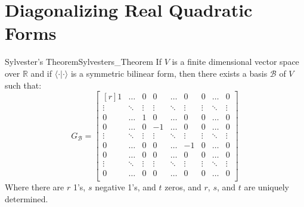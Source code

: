 \documentclass[crop=false,class=article]{standalone}                           %
\begin{document}
    \section{Diagonalizing Real Quadratic Forms}
        \begin{ltheorem}{Sylvester's Theorem}{Sylvesters_Theorem}
            If $V$ is a finite dimensional vector space over $\mathbb{R}$ and if
            $\langle\cdot|\cdot\rangle$ is a symmetric bilinear form, then there
            exists a basis $\mathscr{B}$ of $V$ such that:
            \begin{equation}
                G_{\mathscr{B}}=
                \begin{bmatrix*}[r]
                    1&\dots&0&0&\dots&0&0&\dots&0\\
                    \vdots&\ddots&\vdots&\vdots&\ddots
                        &\vdots&\vdots&\ddots&\vdots\\
                    0&\dots&1&0&\dots&0&0&\dots&0\\
                    0&\dots&0&\minus{1}&\dots&0&0&\dots&0\\
                    \vdots&\ddots&\vdots&\vdots
                        &\ddots&\vdots&\vdots&\ddots&\vdots\\
                    0&\dots&0&0&\dots&\minus{1}&0&\dots&0\\
                    0&\dots&0&0&\dots&0&0&\dots&0\\
                    \vdots&\ddots&\vdots&\vdots&\ddots
                        &\vdots&\vdots&\ddots&\vdots\\
                    0&\dots&0&0&\dots&0&0&\dots&0\\
                \end{bmatrix*}
            \end{equation}
            Where there are $r$ 1's, $s$ negative 1's, and $t$ zeros, and
            $r$, $s$, and $t$ are uniquely determined.
        \end{ltheorem}
\end{document}
